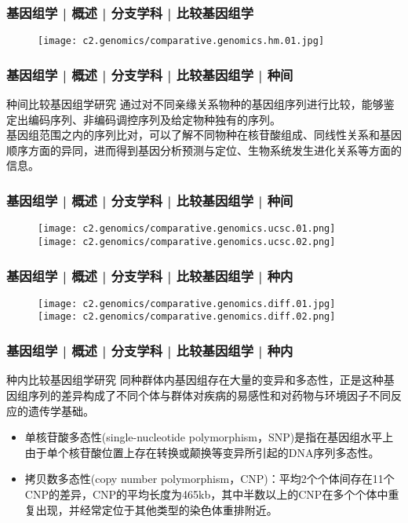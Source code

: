 \begin{frame}
  \frametitle{基因组学 | 概述 | 分支学科 | 比较基因组学}
  \begin{figure}
    \centering
    \texttt{[image: c2.genomics/comparative.genomics.hm.01.jpg]}
  \end{figure}
\end{frame}

\begin{frame}
  \frametitle{基因组学 | 概述 | 分支学科 | 比较基因组学 | 种间}
  \begin{block}{种间比较基因组学研究}
通过对不同亲缘关系物种的基因组序列进行比较，能够鉴定出编码序列、非编码调控序列及给定物种独有的序列。\\
\vspace{1em}
基因组范围之内的序列比对，可以了解不同物种在核苷酸组成、同线性关系和基因顺序方面的异同，进而得到基因分析预测与定位、生物系统发生进化关系等方面的信息。
  \end{block}
\end{frame}

\begin{frame}
  \frametitle{基因组学 | 概述 | 分支学科 | 比较基因组学 | 种间}
  \begin{figure}
    \centering
    \texttt{[image: c2.genomics/comparative.genomics.ucsc.01.png]}\\
    \vspace{0.5em}
    \texttt{[image: c2.genomics/comparative.genomics.ucsc.02.png]}
  \end{figure}
\end{frame}

\begin{frame}
  \frametitle{基因组学 | 概述 | 分支学科 | 比较基因组学 | 种内}
  \begin{figure}
    \centering
    \texttt{[image: c2.genomics/comparative.genomics.diff.01.jpg]}
    \hspace{0.1em}
    \texttt{[image: c2.genomics/comparative.genomics.diff.02.png]}
  \end{figure}
\end{frame}

\begin{frame}
  \frametitle{基因组学 | 概述 | 分支学科 | 比较基因组学 | 种内}
  \begin{block}{种内比较基因组学研究}
同种群体内基因组存在大量的变异和多态性，正是这种基因组序列的差异构成了不同个体与群体对疾病的易感性和对药物与环境因子不同反应的遗传学基础。
\begin{itemize}
  \item 单核苷酸多态性(single-nucleotide polymorphism，SNP)是指在基因组水平上由于单个核苷酸位置上存在转换或颠换等变异所引起的DNA序列多态性。
  \item 拷贝数多态性(copy number polymorphism，CNP)：平均2个个体间存在11个CNP的差异，CNP的平均长度为465kb，其中半数以上的CNP在多个个体中重复出现，并经常定位于其他类型的染色体重排附近。
\end{itemize}
  \end{block}
\end{frame}

